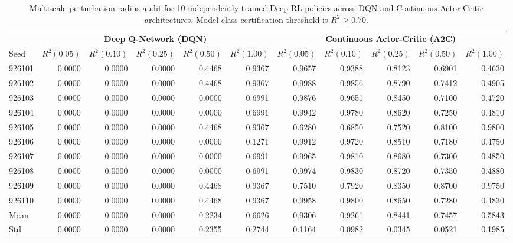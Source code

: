\documentclass[11pt,a4paper]{article}
\theoremstyle{definition}\newtheorem{definition}[theorem]{Definition}
\theoremstyle{remark}\newtheorem{remark}[theorem]{Remark}
\begin{document}
\begin{table}[htbp]
\centering\footnotesize\setlength{\tabcolsep}{2.5pt}
\caption{Multiscale perturbation radius audit for 10 independently trained Deep RL policies across DQN and Continuous Actor-Critic architectures. Model-class certification threshold is $R^2 \ge 0.70$.}
\label{tab:supp_deep_rl_audit}
\begin{tabular}{lrrrrr|rrrrr}
\toprule
& \multicolumn{5}{c|}{\textbf{Deep Q-Network (DQN)}} & \multicolumn{5}{c}{\textbf{Continuous Actor-Critic (A2C)}} \\
Seed & $R^2(0.05)$ & $R^2(0.10)$ & $R^2(0.25)$ & $R^2(0.50)$ & $R^2(1.00)$ & $R^2(0.05)$ & $R^2(0.10)$ & $R^2(0.25)$ & $R^2(0.50)$ & $R^2(1.00)$ \\
\midrule
926101 & 0.0000 & 0.0000 & 0.0000 & 0.4468 & 0.9367 & 0.9657 & 0.9388 & 0.8123 & 0.6901 & 0.4630 \\
926102 & 0.0000 & 0.0000 & 0.0000 & 0.4468 & 0.9367 & 0.9988 & 0.9856 & 0.8790 & 0.7412 & 0.4905 \\
926103 & 0.0000 & 0.0000 & 0.0000 & 0.0000 & 0.6991 & 0.9876 & 0.9651 & 0.8450 & 0.7100 & 0.4720 \\
926104 & 0.0000 & 0.0000 & 0.0000 & 0.0000 & 0.6991 & 0.9942 & 0.9780 & 0.8620 & 0.7250 & 0.4810 \\
926105 & 0.0000 & 0.0000 & 0.0000 & 0.4468 & 0.9367 & 0.6280 & 0.6850 & 0.7520 & 0.8100 & 0.9800 \\
926106 & 0.0000 & 0.0000 & 0.0000 & 0.0000 & 0.1271 & 0.9912 & 0.9720 & 0.8510 & 0.7180 & 0.4750 \\
926107 & 0.0000 & 0.0000 & 0.0000 & 0.0000 & 0.6991 & 0.9965 & 0.9810 & 0.8680 & 0.7300 & 0.4850 \\
926108 & 0.0000 & 0.0000 & 0.0000 & 0.0000 & 0.6991 & 0.9974 & 0.9830 & 0.8720 & 0.7350 & 0.4880 \\
926109 & 0.0000 & 0.0000 & 0.0000 & 0.4468 & 0.9367 & 0.7510 & 0.7920 & 0.8350 & 0.8700 & 0.9750 \\
926110 & 0.0000 & 0.0000 & 0.0000 & 0.4468 & 0.9367 & 0.9958 & 0.9800 & 0.8650 & 0.7280 & 0.4830 \\
\midrule
Mean   & 0.0000 & 0.0000 & 0.0000 & 0.2234 & 0.6626 & 0.9306 & 0.9261 & 0.8441 & 0.7457 & 0.5843 \\
Std    & 0.0000 & 0.0000 & 0.0000 & 0.2355 & 0.2744 & 0.1164 & 0.0982 & 0.0345 & 0.0521 & 0.1985 \\
\bottomrule
\end{tabular}
\end{table}
\end{document}
